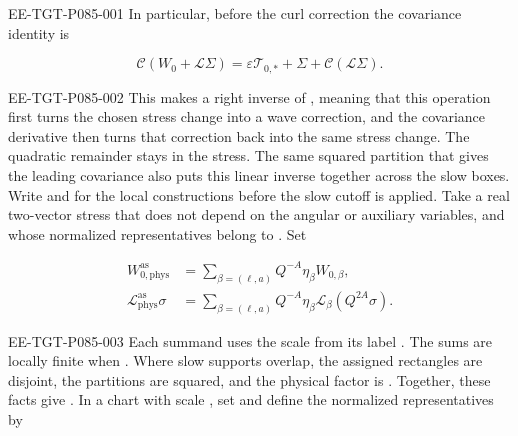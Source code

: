 %
\begin{EESegment}{EE-TGT-P085-001}
In particular, before the curl correction the covariance identity is
\end{EESegment}
\[
  \mathcal C(W_0+\mathcal L\Sigma)=\varepsilon \mathcal T_{0,*}+\Sigma+\mathcal C(\mathcal L\Sigma).
\]
\begin{EESegment}{EE-TGT-P085-002}
This makes  a right inverse of
, meaning that this operation first turns the chosen stress
change into a wave correction, and the covariance derivative then turns that correction back into
the same stress change. The quadratic remainder
 stays in the stress.
The same squared partition that gives the leading covariance also puts this linear inverse
together across the slow boxes. Write  and
 for the local constructions before the slow cutoff is
applied. Take a real two-vector stress  that does not depend
on the angular or auxiliary variables, and whose normalized representatives
 belong to . Set
\end{EESegment}
\begin{equation}
\begin{aligned}
  W_{0,\mathrm{phys}}^{\mathrm{as}}
    &=\sum_{\beta=(\ell,a)} Q^{-A}\eta_\beta W_{0,\beta},\\
  \mathcal L_{\mathrm{phys}}^{\mathrm{as}}\sigma
    &=\sum_{\beta=(\ell,a)} Q^{-A}\eta_\beta\mathcal L_\beta(Q^{2A}\sigma).
\end{aligned}
\tag{7.35}\label{eq:7.35}
\end{equation}
\begin{EESegment}{EE-TGT-P085-003}
Each summand uses the scale  from its label
. The sums are locally finite when
. Where slow supports overlap, the assigned rectangles are disjoint,
the partitions are squared, and the physical factor is . Together,
these facts give . In a chart with scale
, set  and define the normalized representatives by
\end{EESegment}
